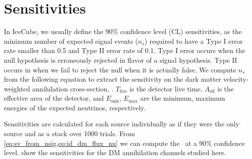 \section{Sensitivities} \label{sec:icDM_sensitivity}

In IceCube, we usually define the 90\% confidence level (CL) sensitivities, as the minimum number of expected signal events ($n_s$) required to have a Type I error rate smaller than 0.5 and Type II error rate of 0.1.
Type I error occurs when the null hypothesis is erroneously rejected in flavor of a signal hypothesis.
Type II occurs in when we fail to reject the null when it is actually false.
We compute  $n_s$ from the following equation
\svFromNSig
to extract the sensitivity on the dark matter velocity-weighted annihilation cross-section, \sv.
$T_\mathrm{live} $ is the detector live time, $ A_\mathrm{eff} $ is the effective area of the detector, and $ E_\mathrm{min} $, $ E_\mathrm{max} $ are the minimum, maximum energies of the expected neutrinos, respectively.


Sensitivities are calculated for each source individually as if they were the only source and as a stack over 1000 trials.
From \cref{eq:sv_from_nsig,eq:id_dm_flux_nu} we can compute the \sv~at a 90\% confidence level.
 show the sensitivities for the DM annihilation channels studied here.

\clearpage

